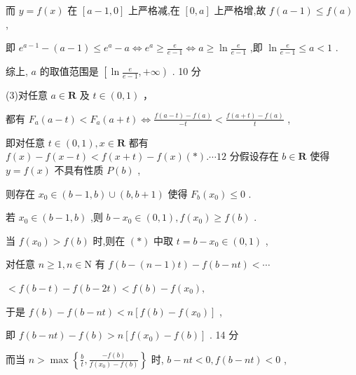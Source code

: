 \documentclass[10pt]{article}
\begin{document}
而 \(y = f\left( x\right)\) 在 \(\left\lbrack  {a - 1,0}\right\rbrack\) 上严格减,在 \(\left\lbrack  {0,a}\right\rbrack\) 上严格增,故 \(f\left( {a - 1}\right)  \leq  f\left( a\right)\) ,

即 \({e}^{a - 1} - \left( {a - 1}\right)  \leq  {e}^{a} - a \Leftrightarrow  {e}^{a} \geq  \frac{e}{e - 1} \Leftrightarrow  a \geq  \ln \frac{e}{e - 1}\) ,即 \(\ln \frac{e}{e - 1} \leq  a < 1\) .

综上, \(a\) 的取值范围是 \(\left\lbrack  {\ln \frac{e}{e - 1}, + \infty }\right)\) . 10 分

(3)对任意 \(a \in  \mathbf{R}\) 及 \(t \in  \left( {0,1}\right)\) ，

都有 \({F}_{a}\left( {a - t}\right)  < {F}_{a}\left( {a + t}\right)  \Leftrightarrow  \frac{f\left( {a - t}\right)  - f\left( a\right) }{-t} < \frac{f\left( {a + t}\right)  - f\left( a\right) }{t}\) ,

即对任意 \(t \in  \left( {0,1}\right) ,x \in  \mathbf{R}\) 都有 \(f\left( x\right)  - f\left( {x - t}\right)  < f\left( {x + t}\right)  - f\left( x\right) \left( *\right) .\cdots {12}\) 分假设存在 \(b \in  \mathbf{R}\) 使得 \(y = f\left( x\right)\) 不具有性质 \(P\left( b\right)\) ,

则存在 \({x}_{0} \in  \left( {b - 1,b}\right)  \cup  \left( {b,b + 1}\right)\) 使得 \({F}_{b}\left( {x}_{0}\right)  \leq  0\) .

若 \({x}_{0} \in  \left( {b - 1,b}\right)\) ,则 \(b - {x}_{0} \in  \left( {0,1}\right) ,f\left( {x}_{0}\right)  \geq  f\left( b\right)\) .

当 \(f\left( {x}_{0}\right)  > f\left( b\right)\) 时,则在 \(\left( *\right)\) 中取 \(t = b - {x}_{0} \in  \left( {0,1}\right)\) ,

对任意 \(n \geq  1,n \in  \mathrm{N}\) 有 \(f\left( {b - \left( {n - 1}\right) t}\right)  - f\left( {b - {nt}}\right)  < \cdots\)

\(< f\left( {b - t}\right)  - f\left( {b - {2t}}\right)  < f\left( b\right)  - f\left( {x}_{0}\right) ,\)

于是 \(f\left( b\right)  - f\left( {b - {nt}}\right)  < n\left\lbrack  {f\left( b\right)  - f\left( {x}_{0}\right) }\right\rbrack\) ,

即 \(f\left( {b - {nt}}\right)  - f\left( b\right)  > n\left\lbrack  {f\left( {x}_{0}\right)  - f\left( b\right) }\right\rbrack\) . 14 分

而当 \(n > \max \left\{  {\frac{b}{t},\frac{-f\left( b\right) }{f\left( {x}_{0}\right)  - f\left( b\right) }}\right\}\) 时, \(b - {nt} < 0,f\left( {b - {nt}}\right)  < 0\) ,
\end{document}
